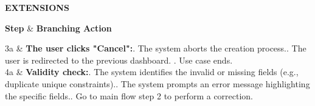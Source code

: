 \documentclass[12pt, a4paper]{article}
\newenvironment{ucextensions}{
    \noindent\textbf{EXTENSIONS} \par \vspace{0.1cm}
    \noindent
    \renewcommand{\arraystretch}{1.3}
    \tabularx{\textwidth}{|>{\centering\arraybackslash}p{1.2cm}|X|}
    \hline
    \rowcolor{gray!30}
    \textbf{Step} & \textbf{Branching Action} \\ \hline
}{
    \endtabularx
    \par\vspace{0.3cm}
}
\begin{document}
\begin{ucextensions}
    3a & \textbf{The user clicks "Cancel":}. The system aborts the creation process.. The user is redirected to the previous dashboard. . Use case ends. \\ \hline
    4a & \textbf{Validity check:}. The system identifies the invalid or missing fields (e.g., duplicate unique constraints).. The system prompts an error message highlighting the specific fields.. Go to main flow step 2 to perform a correction. \\ \hline
\end{ucextensions}
\end{document}
